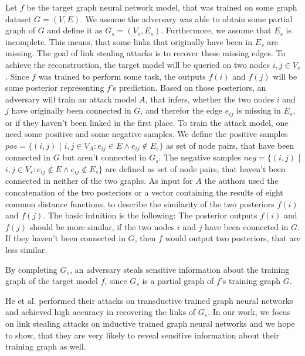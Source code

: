     Let $f$ be the target graph neural network model, that was trained on some graph dataset $G = (V, E)$.
    We assume the adversary was able to obtain some partial graph of $G$ and define it as $G_s = (V_s, E_s)$.
    Furthermore, we assume that $E_s$ is incomplete.
    This means, that some links that originally have been in $E_s$ are missing.
    The goal of link stealing attacks is to recover these missing edges.
    To achieve the reconstruction, the target model will be queried on two nodes $i,j \in V_s$.
    Since $f$ was trained to perform some task, the outputs $f(i)$ and $f(j)$ will be some posterior representing $f$'s prediction.
    Based on those posteriors, an adversary will train an attack model $A$, that infers, whether the two nodes $i$ and $j$ have originally been connected in $G$, and therefor the edge $e_{ij}$ is missing in $E_s$, or if they haven't been linked in the first place.
    To train the attack model, one need some positive and some negative samples.
    We define the positive samples $pos = \{ (i,j)$ | $i,j \in V_A: e_{ij} \in E \wedge e_{ij} \not\in E_s\}$ as set of node pairs, that have been connected in $G$ but aren't connected in $G_s$. 
    The negative samples $neg = \{ (i,j)$ | $i,j \in V_s: e_{ij} \not\in E \wedge e_{ij} \not\in E_s\}$ are defined as set of node pairs, that haven't been connected in neither of the two graphs.
    As input for $A$ the authors used the concatenation of the two posteriors or a vector containing the results of eight common distance functions, to describe the similarity of the two posteriors $f(i)$ and $f(j)$.
    The basic intuition is the following: 
    The posterior outputs $f(i)$ and $f(j)$ should be more similar, if the two nodes $i$ and $j$ have been connected in $G$.
    If they haven't been connected in $G$, then $f$ would output two posteriors, that are less similar.

    By completing $G_s$, an adversary steals sensitive information about the training graph of the target model $f$, since $G_s$ is a partial graph of $f$'s training graph $G$.

    He et al. performed their attacks on transductive trained graph neural networks and achieved high accuracy in recovering the links of $G_s$. 
    In our work, we focus on link stealing attacks on inductive trained graph neural networks and we hope to show, that they are very likely to reveal sensitive information about their training graph as well.